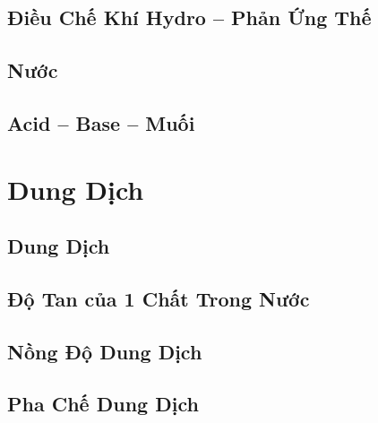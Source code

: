 \documentclass{article}
\numberwithin{equation}{section}
\begin{document}

\subsection{Điều Chế Khí Hydro -- Phản Ứng Thế}


\subsection{Nước}


\subsection{Acid -- Base -- Muối}


\section{Dung Dịch}

\subsection{Dung Dịch}


\subsection{Độ Tan của 1 Chất Trong Nước}


\subsection{Nồng Độ Dung Dịch}


\subsection{Pha Chế Dung Dịch}


\printbibliography[heading=bibintoc]
	
\end{document}
